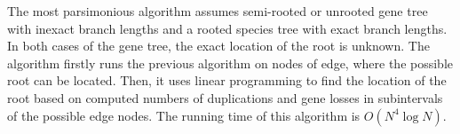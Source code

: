 The most parsimonious algorithm assumes semi-rooted or unrooted gene tree with inexact branch lengths and a rooted species tree with exact branch lengths. In both cases of the gene tree, the exact location of the root is unknown. The algorithm firstly runs the previous algorithm on nodes of edge, where the possible root can be located. Then, it uses linear programming to find the location of the root based on computed numbers of duplications and gene losses in subintervals of the possible edge nodes. The running time of this algorithm is $O(N^4 \log N)$.












